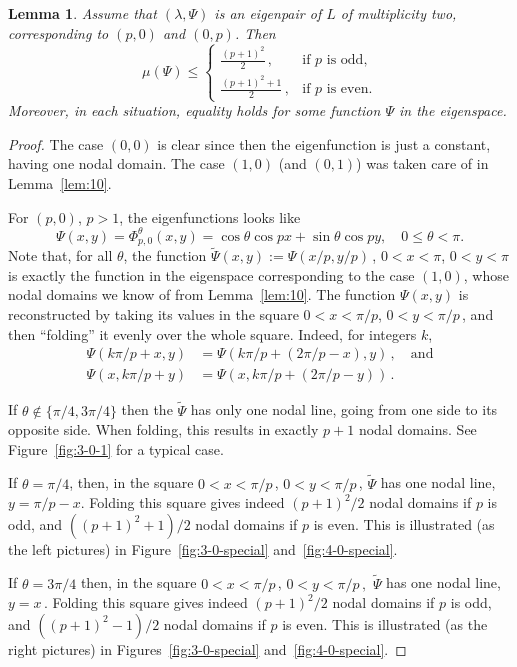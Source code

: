 \documentclass[a4paper,reqno,11pt]{amsart}
\newtheorem{lemma}[thm]{Lemma}
\theoremstyle{remark}
\theoremstyle{definition}
\numberwithin{equation}{section}
\begin{document}
\begin{lemma}
\label{lem:p0}
Assume that $(\lambda,\Psi)$ is an eigenpair of $L$ of multiplicity two, 
corresponding to $(p,0)$  and $(0,p)$. Then
\[
\mu(\Psi)\leq
\begin{cases}
\frac{(p+1)^2}{2}\,, & \text{if $p$ is odd,}\\
\frac{(p+1)^2+1}{2}\,, & \text{if $p$ is even.}
\end{cases}
\]
Moreover, in each situation, equality holds for some function $\Psi$ in the 
eigenspace.
\end{lemma}

\begin{proof}
The case $(0,0)$ is clear since then the eigenfunction is just a constant, 
having one nodal domain. The case $(1,0)$  (and $(0,1)$) was taken care of 
in Lemma~\ref{lem:10}.

For $(p,0)$, $p>1$, the eigenfunctions looks like
\[
\Psi(x,y)=\Phi_{p,0}^\theta(x,y)
=\cos\theta\cos px + \sin\theta\cos py,\quad 0\leq\theta<\pi.
\]
Note that, for all $\theta$, the function $\tilde\Psi(x,y):=\Psi(x/p,y/p)\,$,
$0<x<\pi$, $0<y<\pi$ is exactly the function in the eigenspace corresponding 
to the case $(1,0)$, whose nodal domains we know of from Lemma~\ref{lem:10}. 
The function $\Psi(x,y)$ is reconstructed by taking its
values in the square $0<x<\pi/p$, $0<y<\pi/p\,$, and then ``folding'' it evenly
over the whole square. Indeed, for integers $k$,
\[
\begin{aligned}
\Psi(k\pi/p+x,y)&=\Psi(k\pi/p+(2\pi/p-x),y)\,,\quad\text{and}\\
\Psi(x,k\pi/p+y)&=\Psi(x,k\pi/p+(2\pi/p-y))\,.
\end{aligned}
\]

If $\theta\notin\{\pi/4,3\pi/4\}$ then the $\tilde\Psi$ has only 
one nodal line, going from one side to its opposite side. When folding, 
this results in exactly $p+1$ nodal domains. See Figure~\ref{fig:3-0-1} 
for a typical case.

If $\theta=\pi/4$, then, in the square $0<x<\pi/p\,$, $0<y<\pi/p\,$, $\tilde\Psi$ 
has one nodal line, $y=\pi/p-x$. Folding this square gives indeed 
$(p+1)^2/2$ nodal
domains if $p$ is odd, and $((p+1)^2+1)/2$ nodal domains if $p$ is even. This
is illustrated (as the left pictures) in Figure~\ref{fig:3-0-special} 
and~\ref{fig:4-0-special}.

If $\theta=3\pi/4$ then, in the square $0<x<\pi/p\,$, $0<y<\pi/p\,,$ $\tilde\Psi$ 
has one nodal line, $y=x\,$. Folding this square gives indeed $(p+1)^2/2$ nodal
domains if $p$ is odd, and $((p+1)^2-1)/2$ nodal domains if $p$ is even. This
is illustrated (as the right pictures) in Figures~\ref{fig:3-0-special} and~\ref{fig:4-0-special}.
\end{proof}
\end{document}

